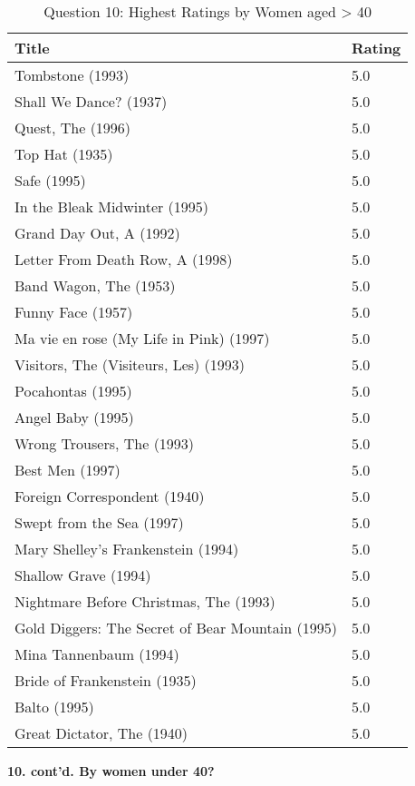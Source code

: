 \begin{table}[h!]
\centering
\begin{tabular}{| l | l |}
\hline
Title & Rating \\
\hline
Tombstone (1993) & 5.0 \\
Shall We Dance? (1937) & 5.0 \\
Quest, The (1996) & 5.0 \\
Top Hat (1935) & 5.0 \\
Safe (1995) & 5.0 \\
In the Bleak Midwinter (1995) & 5.0 \\
Grand Day Out, A (1992) & 5.0 \\
Letter From Death Row, A (1998) & 5.0 \\
Band Wagon, The (1953) & 5.0 \\
Funny Face (1957) & 5.0 \\
Ma vie en rose (My Life in Pink) (1997) & 5.0 \\
Visitors, The (Visiteurs, Les) (1993) & 5.0 \\
Pocahontas (1995) & 5.0 \\
Angel Baby (1995) & 5.0 \\
Wrong Trousers, The (1993) & 5.0 \\
Best Men (1997) & 5.0 \\
Foreign Correspondent (1940) & 5.0 \\
Swept from the Sea (1997) & 5.0 \\
Mary Shelley's Frankenstein (1994) & 5.0 \\
Shallow Grave (1994) & 5.0 \\
Nightmare Before Christmas, The (1993) & 5.0 \\
Gold Diggers: The Secret of Bear Mountain (1995) & 5.0 \\
Mina Tannenbaum (1994) & 5.0 \\
Bride of Frankenstein (1935) & 5.0 \\
Balto (1995) & 5.0 \\
Great Dictator, The (1940) & 5.0 \\
\hline
\end{tabular}
\caption{Question 10: Highest Ratings by Women aged > 40}
\label{tab:hrbow}
\end{table}

\clearpage

\textbf{10. cont'd. By women under 40?}\\

